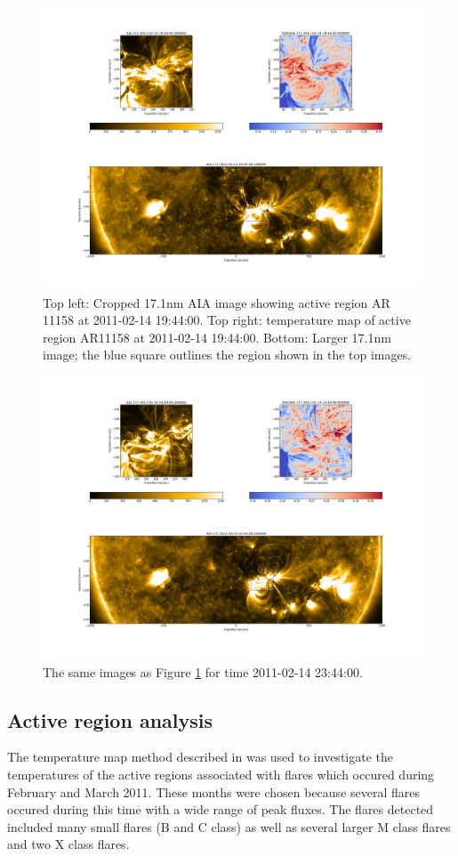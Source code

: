 \documentclass[referee,a4paper,12pt]{swsc}
\begin{document}
\begin{linenumbers}
\begin{figure}
	\centering
		\includegraphics[width=0.9\columnwidth]{20110214T194400with171.png}
	\caption{Top left: Cropped 17.1nm AIA image showing active region AR 11158 at 2011-02-14 19:44:00. Top right: temperature map of active region AR11158 at 2011-02-14 19:44:00. Bottom: Larger 17.1nm image; the blue square outlines the region shown in the top images.}
	\label{fig:trackdemo1}
\end{figure}
\begin{figure}
	\centering
		\includegraphics[width=0.9\columnwidth]{20110214T234400with171.png}
	\caption{The same images as Figure \ref{fig:trackdemo1} for time 2011-02-14 23:44:00.}
	\label{fig:trackdemo2}
\end{figure}

\subsection{Active region analysis}
The temperature map method described in  was used to investigate the temperatures of the active regions associated with flares which occured during February and March 2011.
These months were chosen because several flares occured during this time with a wide range of peak fluxes.
The flares detected included many small flares (B and C class) as well as several larger M class flares and two X class flares.


\end{linenumbers}
\end{document}
